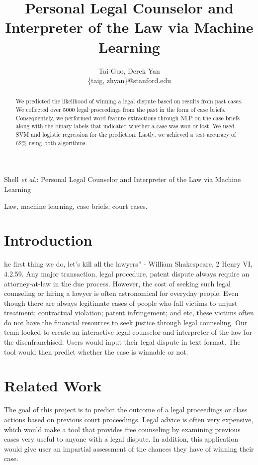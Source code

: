 \documentclass[journal]{IEEEtran}
\begin{document}
\title{Personal Legal Counselor and Interpreter of the Law via Machine Learning}
\author{Tai Guo, Derek Yan\\
\{taig, zhyan\}@stanford.edu}
{Shell \MakeLowercase{\textit{et al.}}: Personal Legal Counselor and Interpreter of the Law via Machine Learning}
\maketitle

\begin{abstract}
We predicted the likelihood of winning a legal dispute based on results from past cases. We collected over 5000 legal proceedings from the past in the form of case briefs. Consequentely, we performed word feature extractions through NLP on the case briefs along with the binary labels that indicated whether a case was won or lost. We used SVM and logistic regression for the prediction. Lastly, we achieved a test accuracy of 62\% using both algorithms.
\end{abstract}

\begin{keywords}
Law, machine learning, case briefs, court cases.
\end{keywords}

\section{Introduction}
 he first thing we do, let’s kill all the lawyers'' - William Shakespeare, 2 Henry VI, 4.2.59. Any major transaction, legal procedure, patent dispute always require an attorney-at-law in the due process. However, the cost of seeking such legal counseling or hiring a lawyer is often astronomical for everyday people. Even though there are always legitimate cases of people who fall victims to unjust treatment; contractual violation; patent infringement; and etc, these victims often do not have the financial resources to seek justice through legal counseling. Our team looked to create an interactive legal counselor and interpreter of the law for the disenfranchised. Users would input their legal dispute in text format. The tool would then predict whether the case is winnable or not.

\section{Related Work}
The goal of this project is to predict the outcome of a legal proceedings or class actions based on previous court proceedings. Legal advice is often very expensive, which would make a tool that provides free counseling by examining previous cases very useful to anyone with a legal dispute. In addition, this application would give user an impartial assessment of the chances they have of winning their case.
\end{document}
